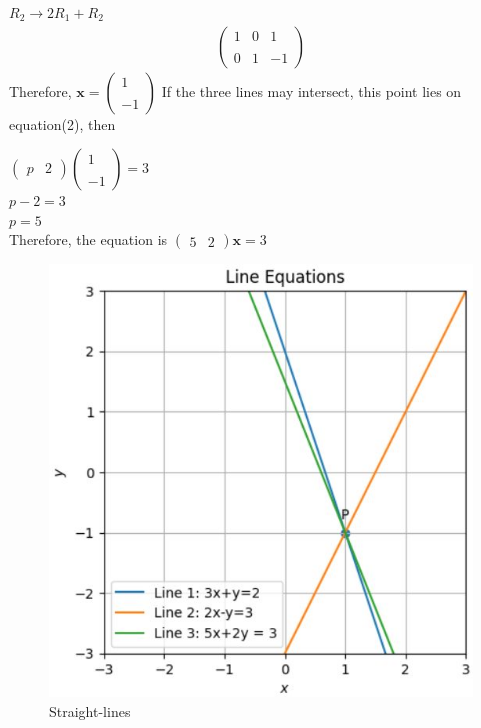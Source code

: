 \documentclass[12pt]{article}
\newcommand{\myvec}[1]{\ensuremath{\begin{pmatrix}#1\end{pmatrix}}}
\let\vec\mathbf
\begin{document}
$ R_2 \rightarrow 2R_1 + R_2 $
\begin{align}
	\begin{pmatrix}
		1 & 0 & 1 \\ \\
		0 & 1 & -1
	\end{pmatrix}
\end{align}
Therefore, $ \vec{x} = \myvec{1 \\ \\ -1} $ If the three lines may intersect, this point lies on equation(2), then\\
\begin{center}
	$ \myvec{p & 2}\myvec{1 \\ \\ -1} = 3 $
	\vspace{\baselineskip}\\
	$ p-2 = 3 $
	\vspace{\baselineskip}\\
	$ p = 5 $
	\vspace{\baselineskip}\\
	Therefore, the equation is $ \myvec{5 & 2}\vec{x} = 3 $
\end{center}
\begin{figure}
	\centering
	\includegraphics[width=\columnwidth]{figs/graph.jpg}
	\caption{Straight-lines}
	\label{fig:st.lines}
\end{figure}
\end{document}
